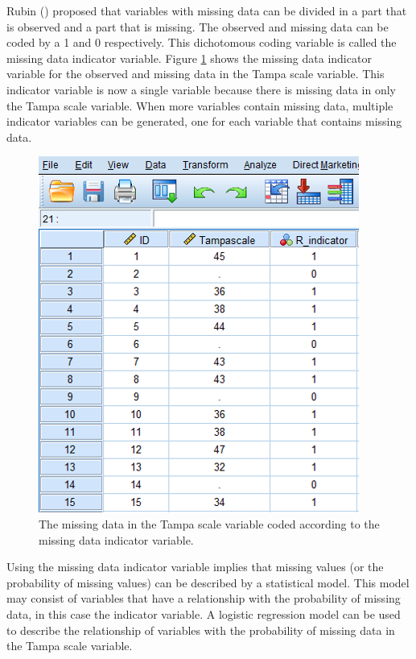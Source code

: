 \documentclass[
]{book}
\begin{document}
Rubin (\citet{Rubin1987}) proposed that variables with missing data can be divided in a part that is observed and a part that is missing. The observed and missing data can be coded by a 1 and 0 respectively. This dichotomous coding variable is called the missing data indicator variable. Figure \ref{fig:fig2-8} shows the missing data indicator variable for the observed and missing data in the Tampa scale variable. This indicator variable is now a single variable because there is missing data in only the Tampa scale variable. When more variables contain missing data, multiple indicator variables can be generated, one for each variable that contains missing data.

\begin{figure}

{\centering \includegraphics[width=0.8\linewidth]{images/fig2.8} 

}

\caption{The missing data in the Tampa scale variable coded according to the missing data indicator variable.}\label{fig:fig2-8}
\end{figure}

Using the missing data indicator variable implies that missing values (or the probability of missing values) can be described by a statistical model. This model may consist of variables that have a relationship with the probability of missing data, in this case the indicator variable. A logistic regression model can be used to describe the relationship of variables with the probability of missing data in the Tampa scale variable.
\end{document}
